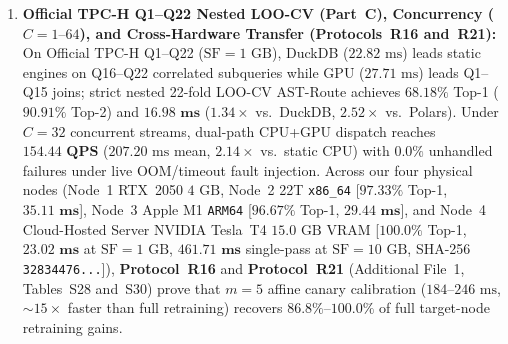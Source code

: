 \documentclass[10pt,a4paper]{article}
\begin{document}
\begin{enumerate}[leftmargin=1.5em,itemsep=1pt]
    \item \textbf{Official TPC-H Q1--Q22 Nested LOO-CV (Part~C), Concurrency ($C=1\text{--}64$), and Cross-Hardware Transfer (\textbf{Protocols~R16 and~R21}):} On Official TPC-H Q1--Q22 ($\text{SF}=1\text{ GB}$), DuckDB ($22.82\text{ ms}$) leads static engines on Q16--Q22 correlated subqueries while GPU ($27.71\text{ ms}$) leads Q1--Q15 joins; strict nested 22-fold LOO-CV AST-Route achieves $\mathbf{68.18\%}$ Top-1 ($\mathbf{90.91\%}$ Top-2) and $\mathbf{16.98\text{ ms}}$ ($\mathbf{1.34\times}$ vs.\ DuckDB, $\mathbf{2.52\times}$ vs.\ Polars). Under $C=32$ concurrent streams, dual-path CPU+GPU dispatch reaches $\mathbf{154.44\text{ QPS}}$ ($207.20\text{ ms}$ mean, $2.14\times$ vs.\ static CPU) with $0.0\%$ unhandled failures under live OOM/timeout fault injection. Across our four physical nodes (Node~1 RTX~2050 $4\text{ GB}$, Node~2 22T \texttt{x86\_64} [$\mathbf{97.33\%}$ Top-1, $\mathbf{35.11\text{ ms}}$], Node~3 Apple M1 \texttt{ARM64} [$\mathbf{96.67\%}$ Top-1, $\mathbf{29.44\text{ ms}}$], and Node~4 Cloud-Hosted Server NVIDIA Tesla~T4 $15.0\text{ GB}$ VRAM [$\mathbf{100.0\%}$ Top-1, $\mathbf{23.02\text{ ms}}$ at $\text{SF}=1\text{ GB}$, $\mathbf{461.71\text{ ms}}$ single-pass at $\text{SF}=10\text{ GB}$, SHA-256 \texttt{32834476...}]), \textbf{Protocol~R16} and \textbf{Protocol~R21} (\label{sec:v9_sec3_2_multiscale_sf100_audit}\label{tab:v11_r21_cross_hardware_transfer_main}Additional File~1, Tables~S28 and~S30) prove that $m=5$ affine canary calibration ($184\text{--}246\text{ ms}$, $\sim 15\times$ faster than full retraining) recovers $\mathbf{86.8\%\text{--}100.0\%}$ of full target-node retraining gains.
\end{enumerate}
\end{document}
